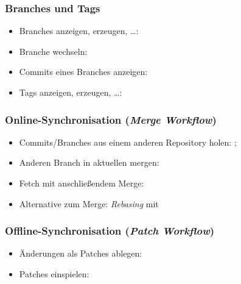 \documentclass{cms-kurs}
\begin{document}
\begin{frame}
  \frametitle{Branches und Tags}

  \onslide<+->

  \begin{itemize}
  \item Branches anzeigen, erzeugen, …: 
  \item Branche wechseln: 
  \item Commits eines Branches anzeigen: 
  \item Tags anzeigen, erzeugen, …: 
  \end{itemize}

\end{frame}

\begin{frame}
  \frametitle{Online-Synchronisation (\emph{Merge Workflow})}

  \onslide<+->

  \begin{itemize}
  \item Commits/Branches aus einem anderen Repository holen: ;
  \item Anderen Branch in aktuellen mergen: 
  \item Fetch mit anschließendem Merge: 
  \item Alternative zum Merge: \emph{Rebasing} mit 
  \end{itemize}

\end{frame}

\begin{frame}
  \frametitle{Offline-Synchronisation (\emph{Patch Workflow})}

  \onslide<+->

  \begin{itemize}
  \item Änderungen als Patches ablegen: 
  \item Patches einspielen: 
  \end{itemize}

\end{frame}
\end{document}
